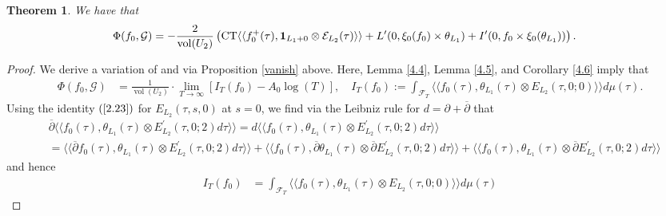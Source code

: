 \documentclass{amsart}
\newtheorem{theorem}{Theorem}[section]
\theoremstyle{definition}
\begin{document}
\begin{theorem}\label{4.7} We have that 
\begin{equation*}\begin{aligned} \Phi( f_0, \mathcal{G}) &=  - \frac{2}{\operatorname{vol}(U_2)} \left( 
 \operatorname{CT} \langle \langle f_0^+(\tau), {\bf{1}}_{L_1 + 0} \otimes \mathcal{E}_{L_2}(\tau) \rangle \rangle 
 + L'(0, \xi_0(f_0) \times \theta_{L_1}) + I'(0, f_0 \times \xi_0(\theta_{L_1})) \right). \end{aligned}\end{equation*} 
  \end{theorem}

\begin{proof} 

We derive a variation of \cite[Theorem 4.7]{BY} and \cite[Theorem 3.5]{Eh} via Proposition \ref{vanish} above. 
Here, Lemma \ref{4.4}, Lemma \ref{4.5}, and Corollary \ref{4.6} imply that
\begin{align}\label{initial} \Phi( f_0, \mathcal{G})
&= \frac{1}{\operatorname{vol}(U_2)} \cdot \lim_{T \rightarrow \infty} \left[  I_T(f_0) - A_0 \log(T) \right], \quad I_T(f_0) := \int_{\mathcal{F}_T} 
\langle \langle f_0(\tau), \theta_{L_1}(\tau) \otimes E_{L_2}(\tau, 0; 0) \rangle \rangle d \mu(\tau). \end{align}
Using the identity $(\ref{2.23})$ for $E_{L_2}(\tau, s, 0)$ at $s=0$, we find via the Leibniz rule for $d = \partial + \overline{\partial}$ that
\begin{equation*}\begin{aligned} &\overline{\partial} \langle \langle f_0(\tau), \theta_{L_1}(\tau) \otimes  E_{L_2}^{\prime}(\tau, 0; 2) d \tau \rangle \rangle
= d \langle \langle f_0(\tau), \theta_{L_1}(\tau) \otimes  E_{L_2}^{\prime}(\tau, 0; 2) d \tau \rangle \rangle \\
&=\langle \langle \overline{\partial} f_0(\tau), \theta_{L_1}(\tau) \otimes E_{L_2}^{\prime}(\tau, 0; 2) d \tau \rangle \rangle
+ \langle \langle f_0(\tau), \overline{\partial} \theta_{L_1}(\tau) \otimes \overline{\partial} E_{L_2}^{\prime}(\tau, 0; 2) d \tau \rangle \rangle
+ \langle \langle f_0(\tau),  \theta_{L_1}(\tau) \otimes \overline{\partial} E_{L_2}^{\prime}(\tau, 0; 2) d \tau \rangle \rangle\end{aligned}\end{equation*} 
and hence 
\begin{equation}\begin{aligned}\label{I_T} I_T(f_0) 
&= \int_{\mathcal{F}_T} \langle \langle f_0(\tau), \theta_{L_1}(\tau) \otimes E_{L_2}(\tau, 0; 0) \rangle \rangle d \mu(\tau) 

\end{aligned}
\end{equation}
\end{proof}
\end{document}
